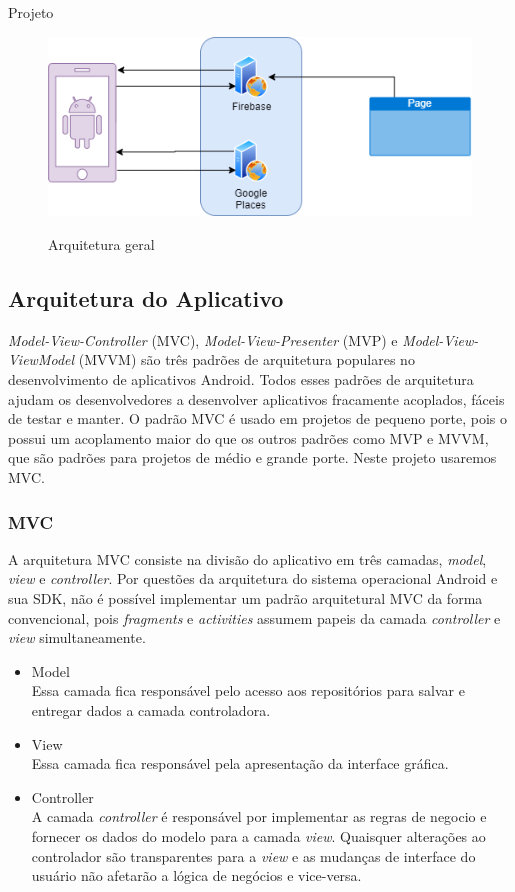 \documentclass[
	12pt,				%
	openright,			%
	twoside,			%
	a4paper,			%
	english,			%
	french,				%
	spanish,			%
	brazil				%
	]{abntex2}
\begin{document}
\begin{chapter}{Projeto}
\begin{figure}[h]
\centering
   \caption{Arquitetura geral}
   \includegraphics[scale=0.85]{media/arquitetura_app.png}
     \label{fig:arquitetura_geral}
\end{figure}

\subsection{Arquitetura do Aplicativo}
\textit{Model-View-Controller} (MVC),  \textit{Model-View-Presenter} (MVP) e \textit{Model-View-ViewModel} (MVVM) são três padrões de arquitetura populares no desenvolvimento de aplicativos Android. Todos esses padrões de arquitetura ajudam os desenvolvedores a desenvolver aplicativos fracamente acoplados, fáceis de testar e manter. O padrão MVC é usado em projetos de pequeno porte, pois o possui um acoplamento maior do que os outros padrões como MVP e MVVM, que são padrões para projetos de médio e grande porte. Neste projeto usaremos MVC.\\

\subsubsection{MVC}
A arquitetura MVC consiste na divisão do aplicativo em três camadas,  \textit{model}, \textit{view} e \textit{controller}. Por questões da arquitetura do sistema operacional Android e sua SDK, não é possível implementar um padrão arquitetural MVC da forma convencional, pois \textit{fragments} e \textit{activities} assumem papeis da camada \textit{controller} e \textit{view} simultaneamente.

\begin{itemize}
  \item{Model}\\ Essa camada fica responsável pelo acesso aos repositórios para salvar e entregar dados a camada controladora.
     \item{View}\\ Essa camada fica responsável pela apresentação da interface gráfica.
       \item{Controller}\\ A camada \textit{controller} é responsável por implementar as regras de negocio e fornecer os dados do modelo para a camada \textit{view}. Quaisquer alterações ao controlador são transparentes para a \textit{view} e as mudanças de interface do usuário não afetarão a lógica de negócios e vice-versa.
\end{itemize}


\end{chapter}
\end{document}
